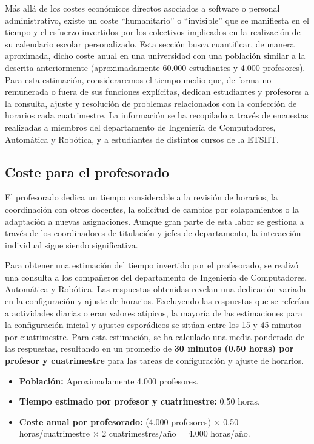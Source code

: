 Más allá de los costes económicos directos asociados a software o personal administrativo, existe un coste ``humanitario'' o ``invisible'' que se manifiesta en el tiempo y el esfuerzo invertidos por los colectivos implicados en la realización de su calendario escolar personalizado. Esta sección busca cuantificar, de manera aproximada, dicho coste anual en una universidad con una población similar a la descrita anteriormente (aproximadamente 60.000 estudiantes y 4.000 profesores).
\newline\newline
Para esta estimación, consideraremos el tiempo medio que, de forma no remunerada o fuera de sus funciones explícitas, dedican estudiantes y profesores a la consulta, ajuste y resolución de problemas relacionados con la confección de horarios cada cuatrimestre. La información se ha recopilado a través de encuestas realizadas a miembros del departamento de Ingeniería de Computadores, Automática y Robótica, y a estudiantes de distintos cursos de la ETSIIT.

\subsection{Coste para el profesorado}

El profesorado dedica un tiempo considerable a la revisión de horarios, la coordinación con otros docentes, la solicitud de cambios por solapamientos o la adaptación a nuevas asignaciones. Aunque gran parte de esta labor se gestiona a través de los coordinadores de titulación y jefes de departamento, la interacción individual sigue siendo significativa.

Para obtener una estimación del tiempo invertido por el profesorado, se realizó una consulta a los compañeros del departamento de Ingeniería de Computadores, Automática y Robótica. Las respuestas obtenidas revelan una dedicación variada en la configuración y ajuste de horarios. Excluyendo las respuestas que se referían a actividades diarias o eran valores atípicos, la mayoría de las estimaciones para la configuración inicial y ajustes esporádicos se sitúan entre los 15 y 45 minutos por cuatrimestre. Para esta estimación, se ha calculado una media ponderada de las respuestas, resultando en un promedio de \textbf{30 minutos (0.50 horas) por profesor y cuatrimestre} para las tareas de configuración y ajuste de horarios.

\begin{itemize}
    \item \textbf{Población:} Aproximadamente 4.000 profesores.
    \item \textbf{Tiempo estimado por profesor y cuatrimestre:} 0.50 horas.
    \item \textbf{Coste anual por profesorado:} (4.000 profesores) $\times$ 0.50 horas/cuatrimestre $\times$ 2 cuatrimestres/año = 4.000 horas/año.
\end{itemize}


